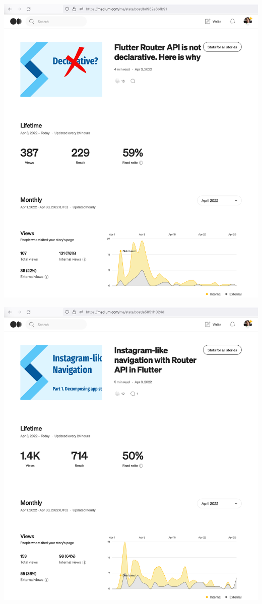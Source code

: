 \begin{center}
    \includegraphics[width=\textwidth]{2022-04-03_1_router}
\end{center}
\pagebreak

\begin{center}
    \includegraphics[width=\textwidth]{2022-04-03_2_decomposing}
\end{center}
\pagebreak

